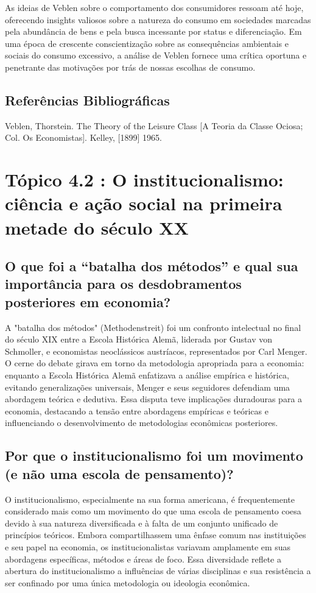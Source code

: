 \documentclass[a4paper,12pt]{article}[abntex2]
\begin{document}
As ideias de Veblen sobre o comportamento dos consumidores ressoam até hoje, oferecendo insights valiosos sobre a natureza do consumo em sociedades marcadas pela abundância de bens e pela busca incessante por status e diferenciação. Em uma época de crescente conscientização sobre as consequências ambientais e sociais do consumo excessivo, a análise de Veblen fornece uma crítica oportuna e penetrante das motivações por trás de nossas escolhas de consumo.

\subsection{\textbf{Referências Bibliográficas}}
Veblen, Thorstein. The Theory of the Leisure Class [A Teoria da Classe Ociosa; Col. Os
Economistas]. Kelley, [1899] 1965.

\section{\textbf{Tópico 4.2 : O institucionalismo: ciência e ação social na primeira metade do século XX}}
\subsection{\textbf{O que foi a “batalha dos métodos” e qual sua importância para os desdobramentos posteriores em economia?}}
A "batalha dos métodos" (Methodenstreit) foi um confronto intelectual no final do século XIX entre a Escola Histórica Alemã, liderada por Gustav von Schmoller, e economistas neoclássicos austríacos, representados por Carl Menger. O cerne do debate girava em torno da metodologia apropriada para a economia: enquanto a Escola Histórica Alemã enfatizava a análise empírica e histórica, evitando generalizações universais, Menger e seus seguidores defendiam uma abordagem teórica e dedutiva. Essa disputa teve implicações duradouras para a economia, destacando a tensão entre abordagens empíricas e teóricas e influenciando o desenvolvimento de metodologias econômicas posteriores.
\subsection{\textbf{Por que o institucionalismo foi um movimento (e não uma escola de pensamento)?}}
O institucionalismo, especialmente na sua forma americana, é frequentemente considerado mais como um movimento do que uma escola de pensamento coesa devido à sua natureza diversificada e à falta de um conjunto unificado de princípios teóricos. Embora compartilhassem uma ênfase comum nas instituições e seu papel na economia, os institucionalistas variavam amplamente em suas abordagens específicas, métodos e áreas de foco. Essa diversidade reflete a abertura do institucionalismo a influências de várias disciplinas e sua resistência a ser confinado por uma única metodologia ou ideologia econômica.
\end{document}
